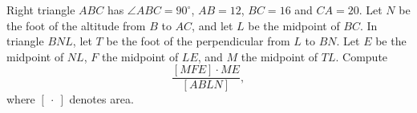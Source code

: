 Right triangle $ABC$ has $\angle ABC=90^\circ$, $AB=12$, $BC=16$ and $CA=20$. Let $N$ be the foot of the altitude from $B$ to $AC$, and let $L$ be the midpoint of $BC$. In triangle $BNL$, let $T$ be the foot of the perpendicular from $L$ to $BN$. Let $E$ be the midpoint of $NL$, $F$ the midpoint of $LE$, and $M$ the midpoint of $TL$. Compute
\[\dfrac{[MFE]\cdot ME}{[ABLN]},\]
where $[\ \cdot\ ]$ denotes area.
